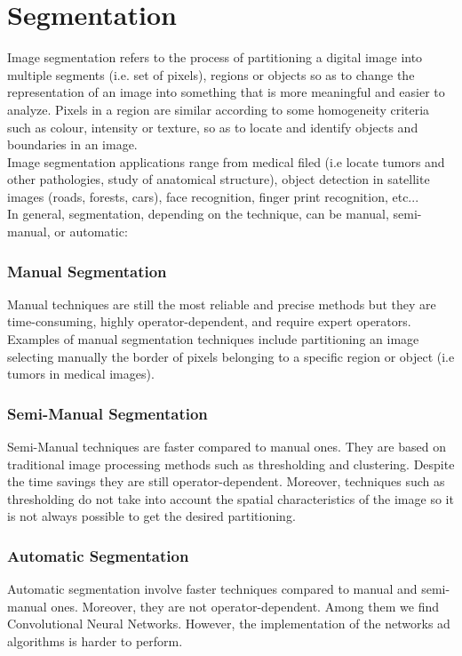 \documentclass{standalone}
\begin{document}
\section{Segmentation}

Image segmentation refers to the process of partitioning a digital image into multiple segments (i.e. set of pixels),  regions or objects so as to change the representation of an image into something that is more meaningful and easier to analyze. Pixels in a region are similar according to some homogeneity criteria such as colour, intensity or texture, so as to locate and identify objects and boundaries in an image\cite{imagesegmentation}.
\\
Image segmentation applications range from medical filed (i.e locate tumors and other pathologies, study of anatomical structure), object detection in satellite images (roads, forests, cars), face recognition, finger print recognition, etc...
\\
In general, segmentation, depending on the technique, can be manual, semi-manual, or automatic:

\subsubsection{Manual Segmentation}
Manual techniques are still the most reliable and precise methods but they are time-consuming, highly operator-dependent, and require expert operators\cite{tesicoppola}.
Examples of manual segmentation techniques include partitioning an image selecting manually the border of pixels belonging to a specific region or object (i.e tumors in medical images).

\subsubsection{Semi-Manual Segmentation}
Semi-Manual techniques are faster compared to manual ones.
They are based on traditional image processing methods such as thresholding and clustering. 
Despite the time savings they are still operator-dependent\cite{tesicoppola}.
Moreover, techniques such as thresholding do not take into account the spatial characteristics of the image so it is not always possible to get the desired partitioning.

\subsubsection{Automatic Segmentation}
Automatic segmentation involve faster techniques compared to manual and semi-manual ones. 
Moreover, they are not operator-dependent. 
Among them we find Convolutional Neural Networks.
However, the implementation of the networks ad algorithms is harder to perform\cite{tesicoppola}. 
\end{document}
